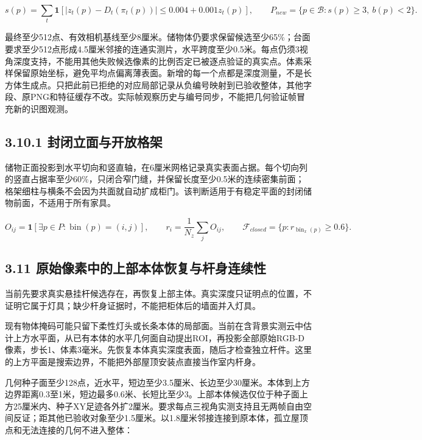 \documentclass[UTF8,fontset=fandol]{ctexart}
\begin{document}
\[
s(p)=\sum_t\mathbf1[|z_t(p)-D_t(\pi_t(p))|\le0.004+0.001z_t(p)],\qquad
P_{new}=\{p\in\mathcal B:s(p)\ge3,\ b(p)<2\}.
\]

最终至少512点、有效相机基线至少8厘米。储物体仍要求保留候选至少65\%；台面要求至少512点形成4.5厘米邻接的连通实测片，水平跨度至少0.5米。每点仍须3视角深度支持，不能用其他失败候选像素的比例否定已被逐点验证的真实点。体素采样保留原始坐标，避免平均点偏离薄表面。新增的每一个点都是深度测量，不是长方体生成点。只把此前已拒绝的对应局部记录从负编号映射到已验收整体，其他字段、原PNG和特征缓存不改。实际帧观察历史与编号同步，不能把几何验证帧冒充新的识图观测。



\subsection*{3.10.1 封闭立面与开放格架}

储物正面投影到水平切向和竖直轴，在6厘米网格记录真实表面占据。每个切向列的竖直占据率至少60\%，只闭合窄门缝，并保留长度至少0.5米的连续密集前面；格架细柱与横条不会因为共面就自动扩成柜门。该判断适用于有稳定平面的封闭储物前面，不适用于所有家具。



\[
O_{ij}=\mathbf1[\exists p\in P:\operatorname{bin}(p)=(i,j)],\qquad
r_i=\frac{1}{N_z}\sum_jO_{ij},\qquad \mathcal F_{closed}=\{p:r_{\operatorname{bin}_x(p)}\ge0.6\}.
\]

\subsection*{3.11 原始像素中的上部本体恢复与杆身连续性}

当前先要求真实悬挂杆候选存在，再恢复上部主体。真实深度只证明点的位置，不证明它属于灯具；缺少杆身证据时，不能把柜体后的墙面并入灯具。



现有物体掩码可能只留下柔性灯头或长条本体的局部面。当前在含背景实测云中估计上方水平面，从已有本体的水平几何面自动提出ROI，再投影全部原始RGB-D像素，步长1、体素3毫米。先恢复本体真实深度表面，随后才检查独立杆件。这里的上方平面是搜索边界，不能把外部屋顶安装点直接当作室内杆身。



几何种子面至少128点，近水平，短边至少3.5厘米、长边至少30厘米。本体到上方边界距离0.3至1米，短边最多0.6米、长短比至少3。上部本体候选仅位于种子面上方25厘米内、种子XY足迹各外扩2厘米。要求每点三视角实测支持且无两帧自由空间反证；距其他已验收对象至少1.5厘米。以1.8厘米邻接连接到原本体，孤立屋顶点和无法连接的几何不进入整体：
\end{document}
